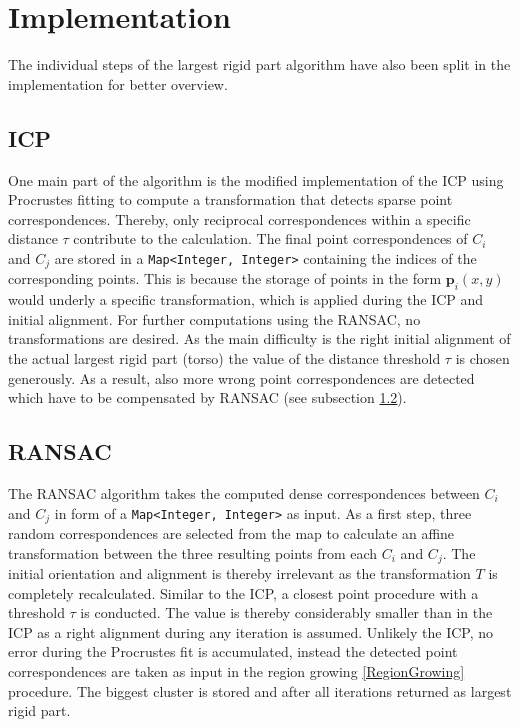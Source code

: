 \section{Implementation}
\label{ImplementationLRP}
The individual steps of the largest rigid part algorithm have also been split in the implementation for better overview. 

\subsection{ICP}
One main part of the algorithm is the modified implementation of the ICP using Procrustes fitting to compute a transformation that detects sparse point correspondences. Thereby, only reciprocal correspondences within a specific distance $\tau$ contribute to the calculation. The final point correspondences of $C_i$ and $C_j$ are stored in a \texttt{Map<Integer, Integer>} containing the indices of the corresponding points. This is because the storage of points in the form $\boldsymbol{p}_i(x,y)$ would underly a specific transformation, which is applied during the ICP and initial alignment. For further computations using the RANSAC, no transformations are desired. As the main difficulty is the right initial alignment of the actual largest rigid part (torso) the value of the distance threshold $\tau$ is chosen generously. As a result, also more wrong point correspondences are detected which have to be compensated by RANSAC (see subsection \ref{RANSAC}).

\subsection{RANSAC}
\label{RANSAC}
The RANSAC algorithm takes the computed dense correspondences between $C_i$ and $C_j$ in form of a \texttt{Map<Integer, Integer>} as input. As a first step, three random correspondences are selected from the map to calculate an affine transformation between the three resulting points from each $C_i$ and $C_j$. The initial orientation and alignment is thereby irrelevant as the transformation $T$ is completely recalculated.
%
%
Similar to the ICP, a closest point procedure with a threshold $\tau$ is conducted. The value is thereby considerably smaller than in the ICP as a right alignment during any iteration is assumed. Unlikely the ICP, no error during the Procrustes fit is accumulated, instead the detected point correspondences are taken as input in the region growing \ref{RegionGrowing} procedure. The biggest cluster is stored and after all iterations returned as largest rigid part.

